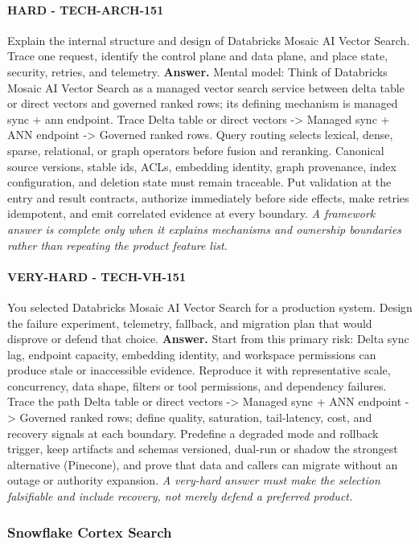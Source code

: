 \paragraph{HARD - TECH-ARCH-151} Explain the internal structure and design of Databricks Mosaic AI Vector Search. Trace one request, identify the control plane and data plane, and place state, security, retries, and telemetry.
\textbf{Answer.} Mental model: Think of Databricks Mosaic AI Vector Search as a managed vector search service between delta table or direct vectors and governed ranked rows; its defining mechanism is managed sync + ann endpoint. Trace Delta table or direct vectors -> Managed sync + ANN endpoint -> Governed ranked rows. Query routing selects lexical, dense, sparse, relational, or graph operators before fusion and reranking. Canonical source versions, stable ids, ACLs, embedding identity, graph provenance, index configuration, and deletion state must remain traceable. Put validation at the entry and result contracts, authorize immediately before side effects, make retries idempotent, and emit correlated evidence at every boundary.
\textit{A framework answer is complete only when it explains mechanisms and ownership boundaries rather than repeating the product feature list.}
\paragraph{VERY-HARD - TECH-VH-151} You selected Databricks Mosaic AI Vector Search for a production system. Design the failure experiment, telemetry, fallback, and migration plan that would disprove or defend that choice.
\textbf{Answer.} Start from this primary risk: Delta sync lag, endpoint capacity, embedding identity, and workspace permissions can produce stale or inaccessible evidence. Reproduce it with representative scale, concurrency, data shape, filters or tool permissions, and dependency failures. Trace the path Delta table or direct vectors -> Managed sync + ANN endpoint -> Governed ranked rows; define quality, saturation, tail-latency, cost, and recovery signals at each boundary. Predefine a degraded mode and rollback trigger, keep artifacts and schemas versioned, dual-run or shadow the strongest alternative (Pinecone), and prove that data and callers can migrate without an outage or authority expansion.
\textit{A very-hard answer must make the selection falsifiable and include recovery, not merely defend a preferred product.}
\subsubsection*{Snowflake Cortex Search}
